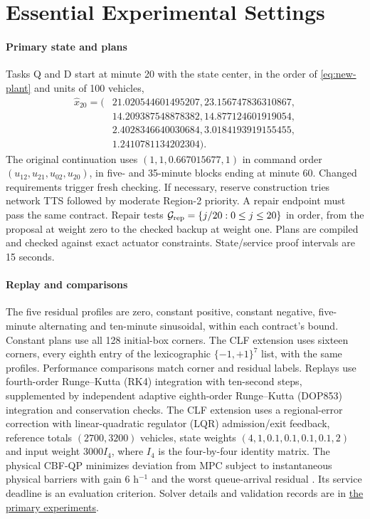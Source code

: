 \documentclass[preprint,12pt]{elsarticle}
\newcommand{\reproductiondetails}[1]{\href{https://github.com/AlienEslami/agentic-perimeter-runtime-certification/blob/main/paper/supporting_materials/REPRODUCING_THE_REDUCED_PAPER.md}{#1}}
\begin{document}
\FloatBarrier


\appendix
\renewcommand{\theequation}{\Alph{section}.\arabic{equation}}
\section{Essential Experimental Settings}
\label{app:experimental-settings}
\label{app:reusable-benchmark}
\label{sec:supp-queue-settings}
\label{app:benchmark-details}

\paragraph{Primary state and plans}
Tasks Q and D start at minute 20 with the state center, in the order of
\eqref{eq:new-plant} and units of 100 vehicles,
\[
\begin{aligned}
\widehat x_{20}=(&21.020544601495207,23.156747836310867,\\
&14.209387548878382,14.877124601919054,\\
&2.4028346640030684,3.0184193919155455,\\
&1.2410781134202304).
\end{aligned}
\]
The original continuation uses $(1,1,0.667015677,1)$ in command order
$(u_{12},u_{21},u_{02},u_{20})$, in five- and
35-minute blocks ending at minute 60. Changed requirements trigger fresh
checking. If necessary, reserve construction tries network TTS followed
by moderate Region-2 priority. A repair endpoint must pass the same
contract. Repair tests $\mathcal G_{\rm rep}=\{j/20:0\le j\le20\}$ in order,
from the proposal at weight zero to the checked backup at weight one. Plans are
compiled and checked against exact actuator constraints. State/service
proof intervals are 15 seconds.

\paragraph{Replay and comparisons}
The five residual profiles are zero, constant positive, constant negative,
five-minute alternating and ten-minute sinusoidal, within each contract's
bound. Constant plans use all 128 initial-box corners. The CLF extension
uses sixteen corners, every eighth entry of the lexicographic
$\{-1,+1\}^7$ list, with the same profiles. Performance comparisons match
corner and residual labels. Replays use fourth-order Runge--Kutta
(RK4) integration with ten-second steps, supplemented by independent
adaptive eighth-order Runge--Kutta (DOP853) integration and conservation
checks. The CLF extension uses a regional-error correction with
linear-quadratic regulator (LQR) admission/exit feedback, reference
totals $(2700,3200)$ vehicles, state weights $(4,1,0.1,0.1,0.1,0.1,2)$
and input weight $3000I_4$, where $I_4$ is the four-by-four identity
matrix. The physical CBF-QP minimizes deviation from
MPC subject to instantaneous physical barriers with gain $6$ h$^{-1}$
and the worst queue-arrival residual \cite{ames2017}. Its service deadline
is an evaluation criterion. Solver details and validation records are in
\reproductiondetails{the primary experiments}.
\end{document}
